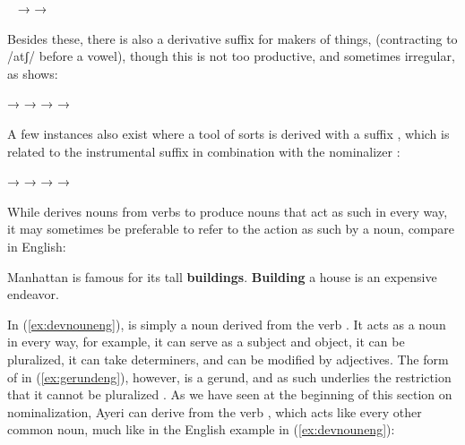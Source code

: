 \pex~\label{ex:vaya}
	\a {}
		→ 
	\a {}
		→ 
\xe

Besides these, there is also a derivative suffix for makers of things, 
 (contracting to /atʃ/  before a vowel), though this 
is not too productive, and sometimes irregular, as 
 shows:

\pex
	\a {}
		→ 
	\a {}
		→ 
	\a {}
		→ 
	\a {}
		→ 
\xe

A few instances also exist where a tool of sorts is derived with a suffix 
, which is related to the instrumental suffix 
 in combination with the nominalizer :

\pex
	\a {}
		→ 
	\a {}
		→ 
	\a {}
		→ 
	\a {}
		→ 
\xe

While  derives nouns from verbs to produce nouns that act as 
such in every way, it may sometimes be preferable to refer to the action as 
such by a noun, compare in English:

\pex
	\a\label{ex:devnouneng} Manhattan is famous for its tall 
		\textbf{buildings}.
	\a\label{ex:gerundeng} \textbf{Building} a house is an expensive 
		endeavor.
\xe

In (\ref{ex:devnouneng}),  is simply a noun derived from the verb 
. It acts as a noun in every way, for example, it can serve as a 
subject and object, it can be pluralized, it can take determiners, and can be 
modified by adjectives. The form of  in (\ref{ex:gerundeng}), 
however, is a gerund, and as such underlies the restriction that it cannot be 
pluralized \citep[35]{payne1997}. As we have seen at the beginning of this 
section on nominalization, Ayeri can derive  from the verb , which acts like every 
other common noun, much like in the English example in (\ref{ex:devnouneng}):

